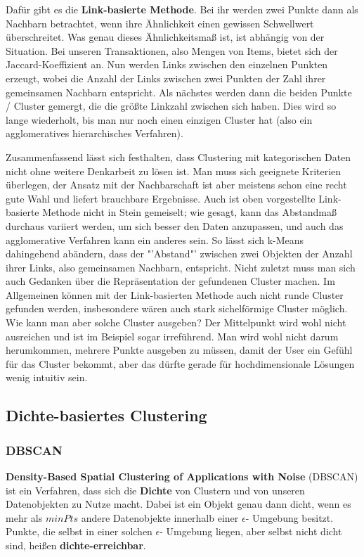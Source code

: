 Dafür gibt es die \textbf{Link-basierte Methode}. Bei ihr werden zwei
Punkte dann als Nachbarn betrachtet, wenn ihre Ähnlichkeit einen
gewissen Schwellwert überschreitet. Was genau dieses Ähnlichkeitsmaß ist,
ist abhängig von der Situation. Bei unseren Transaktionen, also Mengen von
Items, bietet sich der Jaccard-Koeffizient an. Nun werden Links zwischen den
einzelnen Punkten erzeugt, wobei die Anzahl der Links zwischen zwei Punkten
der Zahl ihrer gemeinsamen Nachbarn entspricht. Als nächstes werden dann
die beiden Punkte / Cluster gemergt, die die größte Linkzahl zwischen sich 
haben. Dies wird so lange wiederholt, bis man nur noch einen einzigen Cluster
hat (also ein agglomeratives hierarchisches Verfahren).

Zusammenfassend lässt sich festhalten, dass Clustering mit kategorischen
Daten nicht ohne weitere Denkarbeit zu lösen ist. Man muss sich geeignete
Kriterien überlegen, der Ansatz mit der Nachbarschaft ist aber meistens
schon eine recht gute Wahl und liefert brauchbare Ergebnisse. Auch ist
oben vorgestellte Link-basierte Methode nicht in Stein gemeiselt; wie gesagt,
kann das Abstandmaß durchaus variiert werden, um sich besser den Daten
anzupassen, und auch das agglomerative Verfahren kann ein anderes sein.
So lässt sich k-Means dahingehend abändern, dass der "'Abstand"' zwischen
zwei Objekten der Anzahl ihrer Links, also gemeinsamen Nachbarn, entspricht.
Nicht zuletzt muss man sich auch Gedanken über die Repräsentation der
gefundenen Cluster machen. Im Allgemeinen können mit der Link-basierten
Methode auch nicht runde Cluster gefunden werden, insbesondere wären auch
stark sichelförmige Cluster möglich. Wie kann man aber solche Cluster ausgeben?
Der Mittelpunkt wird wohl nicht ausreichen und ist im Beispiel sogar irreführend.
Man wird wohl nicht darum herumkommen, mehrere Punkte ausgeben zu
müssen, damit der User ein Gefühl für das Cluster bekommt, aber das
dürfte gerade für hochdimensionale Lösungen wenig intuitiv sein.

\subsection{Dichte-basiertes Clustering}
\subsubsection{DBSCAN}
\textbf{Density-Based Spatial Clustering of Applications with Noise} (DBSCAN)
ist ein Verfahren, dass sich die \textbf{Dichte} von Clustern und
von unseren Datenobjekten zu Nutze macht. Dabei ist ein Objekt genau
dann dicht, wenn es mehr als \(minPts\) andere Datenobjekte innerhalb einer
\(\epsilon\)- Umgebung besitzt. Punkte, die selbst in einer solchen
\(\epsilon\)- Umgebung liegen, aber selbst nicht dicht sind, heißen
\textbf{dichte-erreichbar}.

